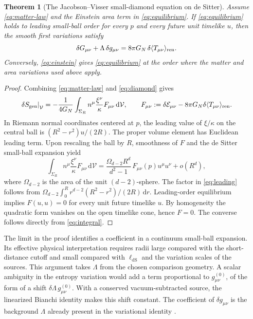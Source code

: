 \documentclass[11pt,a4paper]{article}
\numberwithin{equation}{section}
\newtheorem{theorem}[proposition]{Theorem}
\theoremstyle{remark}
\newcommand{\dd}{\mathrm d}
\newcommand{\Sgen}{S_{\mathrm{gen}}}
\newcommand{\lDS}{\ell_{\mathrm{dS}}}
\newcommand{\GN}{G_N}
\newcommand{\Vol}{\mathcal V}
\newcommand{\EE}{\mathcal E}
\begin{document}
\begin{theorem}[The Jacobson--Visser small-diamond equation on de Sitter]
\label{thm:einstein}
Assume \eqref{eq:matter-law} and the Einstein area term in \eqref{eq:equilibrium}. If \eqref{eq:equilibrium} holds to leading small-ball order for every $p$ and every future unit timelike $u$, then the smooth first variations satisfy
\begin{equation}
 \delta G_{\mu\nu}+\Lambda\,\delta g_{\mu\nu}
      =8\pi\GN\,\delta\langle T_{\mu\nu}\rangle_{\rm ren}.
 \label{eq:einstein}
\end{equation}
Conversely, \eqref{eq:einstein} gives \eqref{eq:equilibrium} at the order where the matter and area variations used above apply.
\end{theorem}

\begin{proof}
Combining \eqref{eq:matter-law} and \eqref{eq:diamond} gives
\begin{equation}
 \left.\delta\Sgen\right|_{\Vol}
 =-\frac{1}{4\GN}\int_{\Sigma_R}
          n^\mu\frac{\xi^\nu}{\kappa}F_{\mu\nu}\,\dd\Vol,\qquad
 F_{\mu\nu}:=\delta\EE_{\mu\nu}
           -8\pi\GN\delta\langle T_{\mu\nu}\rangle_{\rm ren}.
 \label{eq:integral}
\end{equation}
In Riemann normal coordinates centered at $p$, the leading value of $\xi/\kappa$ on the central ball is $(R^2-r^2)u/(2R)$. The proper volume element has Euclidean leading term. Upon rescaling the ball by $R$, smoothness of $F$ and the de Sitter small-ball expansion yield
\begin{equation}
 \int_{\Sigma_R}n^\mu\frac{\xi^\nu}{\kappa}F_{\mu\nu}\,\dd\Vol
   =\frac{\Omega_{d-2}R^d}{d^2-1}\,F_{\mu\nu}(p)u^\mu u^\nu+o(R^d),
 \label{eq:leading}
\end{equation}
where $\Omega_{d-2}$ is the area of the unit $(d-2)$-sphere. The factor in \eqref{eq:leading} follows from
$\Omega_{d-2}\int_0^R r^{d-2}(R^2-r^2)/(2R)\,\dd r$.
Leading-order equilibrium implies $F(u,u)=0$ for every unit future timelike $u$. By homogeneity the quadratic form vanishes on the open timelike cone, hence $F=0$. The converse follows directly from \eqref{eq:integral}.
\end{proof}

The limit in the proof identifies a coefficient in a continuum small-ball expansion. Its effective physical interpretation requires radii large compared with the short-distance cutoff and small compared with $\lDS$ and the variation scales of the sources. This argument takes $\Lambda$ from the chosen comparison geometry. A scalar ambiguity in the entropy variation would add a term proportional to $g^{(0)}_{\mu\nu}$, of the form of a shift $\delta\Lambda\,g^{(0)}_{\mu\nu}$. With a conserved vacuum-subtracted source, the linearized Bianchi identity makes this shift constant. The coefficient of $\delta g_{\mu\nu}$ is the background $\Lambda$ already present in the variational identity \cite{Jacobson2016,JacobsonVisser2019}.
\end{document}
